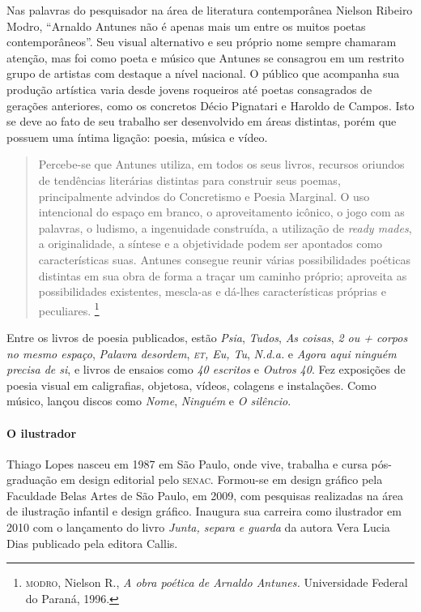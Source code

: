\documentclass[11pt]{extarticle}
\begin{document}
Nas palavras do pesquisador na área de literatura contemporânea Nielson Ribeiro Modro, 
``Arnaldo Antunes não é apenas mais um entre os muitos poetas contemporâneos''.
Seu visual alternativo e seu próprio nome sempre chamaram atenção, mas foi como poeta 
e músico que Antunes se consagrou em um
restrito grupo de artistas com destaque a nível nacional. O público que acompanha sua
produção artística varia desde jovens roqueiros até poetas consagrados de gerações anteriores, como os concretos Décio
Pignatari e Haroldo de Campos. Isto se deve ao fato de seu trabalho ser desenvolvido em
áreas distintas, porém que possuem uma íntima ligação: poesia, música e vídeo.

\begin{quote}
Percebe-se que Antunes
utiliza, em todos os seus livros, recursos oriundos de tendências literárias distintas para
construir seus poemas, principalmente advindos do Concretismo e Poesia Marginal. O uso
intencional do espaço em branco, o aproveitamento icônico, o jogo com as palavras, o
ludismo, a ingenuidade construída, a utilização de \textit{ready mades}, a originalidade, a síntese e
a objetividade podem ser apontados como características suas. Antunes consegue reunir
várias possibilidades poéticas distintas em sua obra de forma a traçar um caminho próprio;
aproveita as possibilidades existentes, mescla-as e dá-lhes características próprias e
peculiares. \footnote{\textsc{modro}, Nielson R., \textit{A obra poética de Arnaldo Antunes.} Universidade Federal do Paraná, 1996.}
\end{quote}


Entre os livros de poesia publicados, estão \emph{Psia}, \emph{Tudos}, 
\emph{As coisas}, \emph{2 ou + corpos no mesmo espaço}, \emph{Palavra desordem}, 
\emph{\textsc{et}, Eu, Tu}, \emph{N.d.a.} e \emph{Agora aqui ninguém precisa de si}, 
e livros de ensaios como \emph{40 escritos} e \emph{Outros 40}.  
Fez exposições de poesia visual em caligrafias, objetosa, vídeos, colagens e instalações. 
Como músico, lançou discos como \emph{Nome}, \emph{Ninguém} e \emph{O silêncio}.

\paragraph{O ilustrador}

Thiago Lopes nasceu em 1987 em São Paulo, onde vive, trabalha e cursa pós-graduação em 
design editorial pelo \textsc{senac}. Formou-se em design gráfico pela Faculdade Belas 
Artes de São Paulo, em 2009, com pesquisas realizadas na área de ilustração infantil e design gráfico. 
Inaugura sua carreira como ilustrador em 2010 com o lançamento do livro \textit{Junta, separa e guarda}
da autora Vera Lucia Dias publicado pela editora Callis. 
\end{document}
